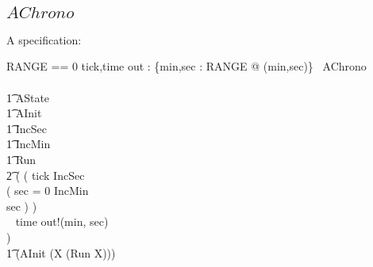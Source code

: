 \subsection{$AChrono$}

A specification:
\begin{circus}
RANGE == 0 
\also \circchannel tick,time
\also \circchannel out : \{min,sec : RANGE @ (min,sec)\}
\also
\circprocess\ AChrono \circdef\\
\circbegin\\
\t1 \circstate AState \\
\t1 AInit \\
\t1 IncSec \\
\t1 IncMin \\
\t1 Run \circdef \\
\t2 (
(
  tick \then \lschexpract IncSec \rschexpract \circseq \\
      (
        \circif sec = 0 \circthen \lschexpract IncMin \rschexpract\\
        \circelse sec  \circthen \Skip \circfi
      )
)\\
    \extchoice~ time \then out!(min, sec) \then \Skip \\
)\\
\t1 \circspot (\lschexpract AInit \rschexpract \circseq (\circmu X \circspot (Run \circseq X)))\\
\circend
\end{circus}

